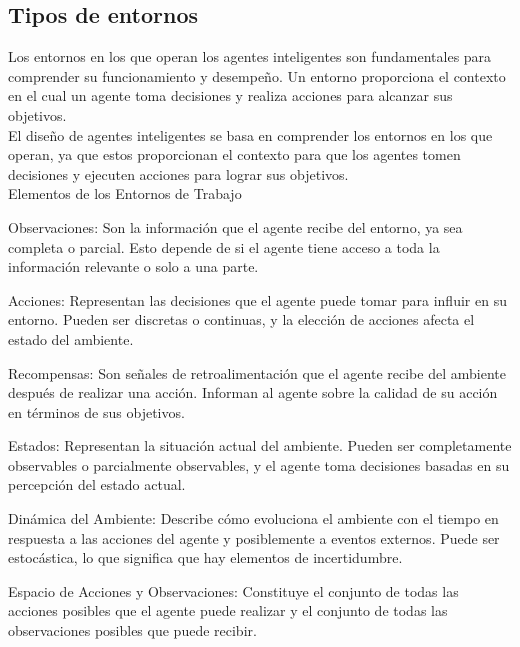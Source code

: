 \subsection{Tipos de entornos}

Los entornos en los que operan los agentes inteligentes son fundamentales para comprender su
funcionamiento y desempeño. Un entorno proporciona el contexto en el cual un agente toma
decisiones y realiza acciones para alcanzar sus objetivos.\\ 

El diseño de agentes inteligentes se basa en comprender los entornos en los que operan, ya 
que estos proporcionan el contexto para que los agentes tomen decisiones y ejecuten 
acciones para lograr sus objetivos.\\ 



\noindent \textcolor{Contraste4}{Elementos de los Entornos de Trabajo}\\

\begin{myitemize}
    \item Observaciones: Son la información que el agente recibe del entorno, ya sea completa o parcial. Esto depende de si el agente tiene acceso a toda la información relevante o solo a una parte.
    \item Acciones: Representan las decisiones que el agente puede tomar para influir en su entorno. Pueden ser discretas o continuas, y la elección de acciones afecta el estado del ambiente.
    \item Recompensas: Son señales de retroalimentación que el agente recibe del ambiente después de realizar una acción. Informan al agente sobre la calidad de su acción en términos de sus objetivos.
    \item Estados: Representan la situación actual del ambiente. Pueden ser completamente observables o parcialmente observables, y el agente toma decisiones basadas en su percepción del estado actual.
    \item Dinámica del Ambiente: Describe cómo evoluciona el ambiente con el tiempo en respuesta a las acciones del agente y posiblemente a eventos externos. Puede ser estocástica, lo que significa que hay elementos de incertidumbre.
    \item Espacio de Acciones y Observaciones: Constituye el conjunto de todas las acciones posibles que el agente puede realizar y el conjunto de todas las observaciones posibles que puede recibir.
\end{myitemize}


